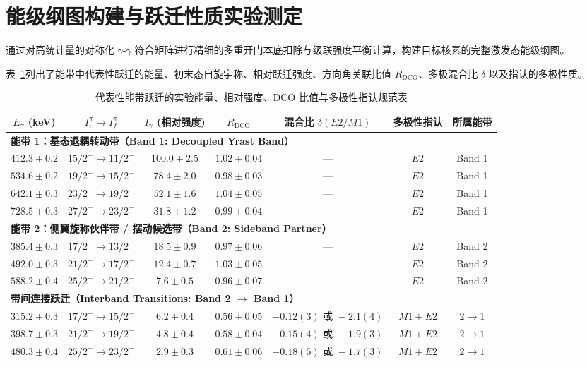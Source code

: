 \section{能级纲图构建与跃迁性质实验测定}
\label{sec:level_scheme_and_transitions}

通过对高统计量的对称化 $\gamma$-$\gamma$ 符合矩阵进行精细的多重开门本底扣除与级联强度平衡计算，构建目标核素的完整激发态能级纲图。

表~\ref{tab:experimental_levels}列出了能带中代表性跃迁的能量、初末态自旋宇称、相对跃迁强度、方向角关联比值 $R_{\text{DCO}}$、多极混合比 $\delta$ 以及指认的多极性质。

\begin{table}[htbp]
    \centering
    \small
    \caption{代表性能带跃迁的实验能量、相对强度、DCO 比值与多极性指认规范表}
    \label{tab:experimental_levels}
    \begin{tabular}{ccccccc}
        \toprule
        $E_\gamma$ (keV) & $I_i^\pi \to I_f^\pi$ & $I_\gamma$ (相对强度) & $R_{\text{DCO}}$ & 混合比 $\delta(E2/M1)$ & 多极性指认 & 所属能带 \\
        \midrule
        \multicolumn{7}{l}{\textbf{能带 1：基态退耦转动带（Band 1: Decoupled Yrast Band）}} \\
        $412.3 \pm 0.2$ & $15/2^- \to 11/2^-$ & $100.0 \pm 2.5$ & $1.02 \pm 0.04$ & --- & $E2$ & Band 1 \\
        $534.6 \pm 0.2$ & $19/2^- \to 15/2^-$ & $78.4 \pm 2.0$  & $0.98 \pm 0.03$ & --- & $E2$ & Band 1 \\
        $642.1 \pm 0.3$ & $23/2^- \to 19/2^-$ & $52.1 \pm 1.6$  & $1.04 \pm 0.05$ & --- & $E2$ & Band 1 \\
        $728.5 \pm 0.3$ & $27/2^- \to 23/2^-$ & $31.8 \pm 1.2$  & $0.99 \pm 0.04$ & --- & $E2$ & Band 1 \\
        \midrule
        \multicolumn{7}{l}{\textbf{能带 2：侧翼旋称伙伴带 / 摆动候选带（Band 2: Sideband Partner）}} \\
        $385.4 \pm 0.3$ & $17/2^- \to 13/2^-$ & $18.5 \pm 0.9$  & $0.97 \pm 0.06$ & --- & $E2$ & Band 2 \\
        $492.0 \pm 0.3$ & $21/2^- \to 17/2^-$ & $12.4 \pm 0.7$  & $1.03 \pm 0.05$ & --- & $E2$ & Band 2 \\
        $588.2 \pm 0.4$ & $25/2^- \to 21/2^-$ & $7.6 \pm 0.5$   & $0.96 \pm 0.07$ & --- & $E2$ & Band 2 \\
        \midrule
        \multicolumn{7}{l}{\textbf{带间连接跃迁（Interband Transitions: Band 2 $\to$ Band 1）}} \\
        $315.2 \pm 0.3$ & $17/2^- \to 15/2^-$ & $6.2 \pm 0.4$   & $0.56 \pm 0.05$ & $-0.12(3) \text{ 或 } -2.1(4)$ & $M1+E2$ & $2 \to 1$ \\
        $398.7 \pm 0.3$ & $21/2^- \to 19/2^-$ & $4.8 \pm 0.4$   & $0.58 \pm 0.04$ & $-0.15(4) \text{ 或 } -1.9(3)$ & $M1+E2$ & $2 \to 1$ \\
        $480.3 \pm 0.4$ & $25/2^- \to 23/2^-$ & $2.9 \pm 0.3$   & $0.61 \pm 0.06$ & $-0.18(5) \text{ 或 } -1.7(3)$ & $M1+E2$ & $2 \to 1$ \\
        \bottomrule
    \end{tabular}
\end{table}

